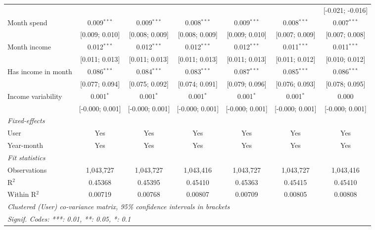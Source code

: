 \begin{table}[htbp]
\begin{threeparttable}[b]
\begin{tabular}{lcccccc}
                                    &                 &                 &                 &                  &                  & [-0.021; -0.016]\\   
         Month spend                & 0.009$^{***}$   & 0.009$^{***}$   & 0.008$^{***}$   & 0.009$^{***}$    & 0.008$^{***}$    & 0.007$^{***}$\\   
                                    & [0.009; 0.010]  & [0.008; 0.009]  & [0.008; 0.009]  & [0.009; 0.010]   & [0.007; 0.009]   & [0.007; 0.008]\\   
         Month income               & 0.012$^{***}$   & 0.012$^{***}$   & 0.012$^{***}$   & 0.012$^{***}$    & 0.011$^{***}$    & 0.011$^{***}$\\   
                                    & [0.011; 0.013]  & [0.011; 0.013]  & [0.011; 0.013]  & [0.011; 0.013]   & [0.011; 0.012]   & [0.010; 0.012]\\   
         Has income in month        & 0.086$^{***}$   & 0.084$^{***}$   & 0.083$^{***}$   & 0.087$^{***}$    & 0.085$^{***}$    & 0.086$^{***}$\\   
                                    & [0.077; 0.094]  & [0.075; 0.092]  & [0.074; 0.091]  & [0.079; 0.096]   & [0.076; 0.093]   & [0.078; 0.095]\\   
         Income variability         & 0.001$^{*}$     & 0.001$^{*}$     & 0.001$^{*}$     & 0.001$^{*}$      & 0.001$^{*}$      & 0.000\\   
                                    & [-0.000; 0.001] & [-0.000; 0.001] & [-0.000; 0.001] & [-0.000; 0.001]  & [-0.000; 0.001]  & [-0.000; 0.001]\\   
         \midrule
         \emph{Fixed-effects}\\
         User                       & Yes             & Yes             & Yes             & Yes              & Yes              & Yes\\  
         Year-month                 & Yes             & Yes             & Yes             & Yes              & Yes              & Yes\\  
         \midrule
         \emph{Fit statistics}\\
         Observations               & 1,043,727       & 1,043,727       & 1,043,416       & 1,043,727        & 1,043,727        & 1,043,416\\  
         R$^2$                      & 0.45368         & 0.45395         & 0.45410         & 0.45363          & 0.45415          & 0.45410\\  
         Within R$^2$               & 0.00719         & 0.00768         & 0.00807         & 0.00709          & 0.00805          & 0.00808\\  
         \midrule \midrule
         \multicolumn{7}{l}{\emph{Clustered (User) co-variance matrix, 95\% confidence intervals in brackets}}\\
         \multicolumn{7}{l}{\emph{Signif. Codes: ***: 0.01, **: 0.05, *: 0.1}}\\
      \end{tabular}
   \end{threeparttable}
\end{table}


